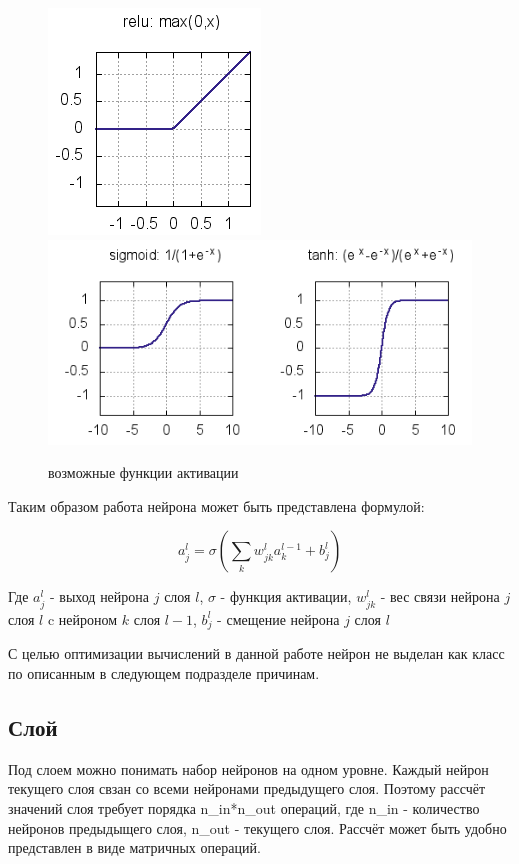 \documentclass[a4paper,12pt]{article}
\begin{document}
\begin{center}
	\begin{figure}[h]
		\centering
   		\includegraphics[scale=0.7]{img/act_relu.png}
   		\includegraphics[scale=0.7]{img/act_sigm_tanh.png}
   		\caption{возможные функции активации}
   		\label{fig:act_functs}
    \end{figure}
\end{center}

Таким образом работа нейрона может быть представлена формулой:

{\large $$a^{l}_j = \sigma\left( \sum_k w^{l}_{jk} a^{l-1}_k + b^l_j \right)$$}

Где $a^l_j $ - выход нейрона $j$ слоя $l$, $ \sigma $ - функция активации, $w^l_{jk}$ - вес связи нейрона $j$ слоя $l$ c нейроном $k$ слоя $l-1$, $b^l_j$ - смещение нейрона $j$ слоя $l$

С целью оптимизации вычислений в данной работе нейрон не выделан как класс по описанным в следующем подразделе причинам.

\subsection{Слой}
Под слоем можно понимать набор нейронов на одном уровне. Каждый нейрон текущего слоя свзан со всеми нейронами предыдущего слоя. Поэтому рассчёт значений слоя требует порядка n\_in*n\_out операций, где n\_in - количество нейронов предыдыщего слоя, n\_out - текущего слоя. Рассчёт может быть удобно представлен в виде матричных операций. 
\end{document}
